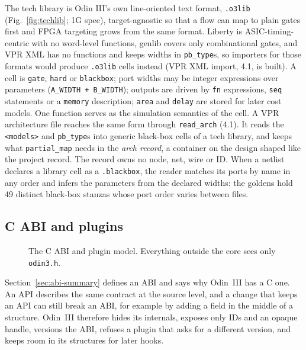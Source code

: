 \documentclass[conference]{IEEEtran}
\newcommand{\code}[1]{\texttt{#1}}
\begin{document}
The tech library is Odin III's own line-oriented text format, \code{.o3lib}
(Fig.~\ref{fig:techlib}; 1G spec), target-agnostic so that a flow can map to plain gates
first and FPGA targeting grows from the same format. Liberty is ASIC-timing-centric with no
word-level functions, genlib covers only combinational gates, and VPR XML has no functions and
keeps widths in \code{pb\_type}s, so importers for those formats would produce \code{.o3lib}
cells instead (VPR XML import, 4.1, is built). A cell is \code{gate}, \code{hard} or \code{blackbox}; port widths may be integer
expressions over parameters (\code{A\_WIDTH + B\_WIDTH}); outputs are driven by \code{fn}
expressions, \code{seq} statements or a \code{memory} description; \code{area} and \code{delay}
are stored for later cost models. One function serves as the simulation semantics of the cell. A VPR architecture file reaches the same form through \code{read\_arch} (4.1). It reads the
\code{<models>} and \code{pb\_type}s into generic black-box cells of a tech library, and keeps what
\code{partial\_map} needs in the \emph{arch record}, a container on the design shaped like the
project record. The record owns no node, net, wire or ID. When a netlist declares a library cell
as a \code{.blackbox}, the reader matches its ports by name in any order and infers the
parameters from the declared widths: the goldens hold 49 distinct black-box stanzas whose port
order varies between files.

\subsection{C ABI and plugins}
\label{sec:abi}

\begin{figure}[t]
\centering
\odinfit{\columnwidth}{}
\caption{The C ABI and plugin model. Everything outside the core sees only \code{odin3.h}.}
\label{fig:abi}
\end{figure}


Section~\ref{sec:abi-summary} defines an ABI and says why Odin~III has a C one. An API describes
the same contract at the source level, and a change that keeps an API can still break an ABI, for
example by adding a field in the middle of a structure. Odin~III therefore hides its internals,
exposes only IDs and an opaque handle, versions the ABI, refuses a plugin that asks for a different
version, and keeps room in its structures for later hooks.
\end{document}
